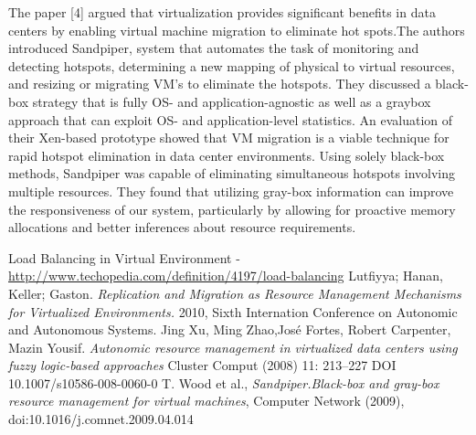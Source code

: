 \documentclass[12pt]{article} %
\begin{document}
The paper [4] argued that virtualization provides significant
benefits in data centers by enabling virtual machine
migration to eliminate hot spots.The authors introduced Sandpiper,  system that automates the task of monitoring and detecting
hotspots, determining a new mapping of physical to
virtual resources, and resizing or migrating VM’s to eliminate
the hotspots. They discussed a black-box strategy that
is fully OS- and application-agnostic as well as a graybox
approach that can exploit OS- and application-level
statistics. An evaluation of their Xen-based prototype
showed that VM migration is a viable technique for rapid
hotspot elimination in data center environments. Using solely
black-box methods, Sandpiper was capable of eliminating
simultaneous hotspots involving multiple resources.
They found that utilizing gray-box information can improve
the responsiveness of our system, particularly by allowing
for proactive memory allocations and better inferences
about resource requirements.



\newpage

\begin{thebibliography}{9}

  Load Balancing in Virtual Environment -
 \url{http://www.techopedia.com/definition/4197/load-balancing}
Lutfiyya; Hanan, Keller; Gaston.
\emph{Replication and Migration as Resource Management Mechanisms for Virtualized Environments.}
2010, Sixth Internation Conference on Autonomic and Autonomous Systems.
Jing Xu, Ming Zhao,José Fortes, Robert Carpenter,
Mazin Yousif. \emph{Autonomic resource management in virtualized data centers using
fuzzy logic-based approaches} Cluster Comput (2008) 11: 213–227
DOI 10.1007/s10586-008-0060-0
T. Wood et al., \emph{Sandpiper.Black-box and gray-box resource management for virtual machines}, Computer Network (2009), doi:10.1016/j.comnet.2009.04.014

\end{thebibliography}
\end{document}
